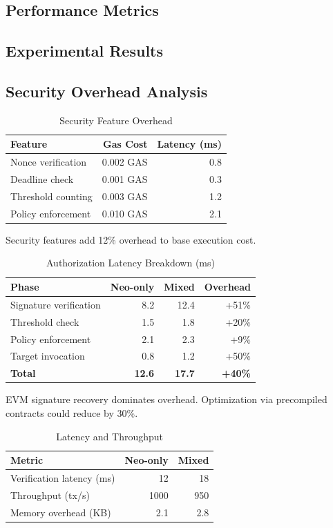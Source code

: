 \documentclass[10pt,twocolumn]{article}
\begin{document}
\subsection{Performance Metrics}

\subsection{Experimental Results}

\subsection{Security Overhead Analysis}

\begin{table}[h]
\centering
\caption{Security Feature Overhead}
\begin{tabular}{@{}lrr@{}}
\toprule
Feature & Gas Cost & Latency (ms) \\\midrule
Nonce verification & 0.002 GAS & 0.8 \\
Deadline check & 0.001 GAS & 0.3 \\
Threshold counting & 0.003 GAS & 1.2 \\
Policy enforcement & 0.010 GAS & 2.1 \\
\bottomrule
\end{tabular}
\end{table}

Security features add 12\% overhead to base execution cost.


\begin{table}[h]
\centering
\caption{Authorization Latency Breakdown (ms)}
\begin{tabular}{@{}lrrr@{}}
\toprule
Phase & Neo-only & Mixed & Overhead \\\midrule
Signature verification & 8.2 & 12.4 & +51\% \\
Threshold check & 1.5 & 1.8 & +20\% \\
Policy enforcement & 2.1 & 2.3 & +9\% \\
Target invocation & 0.8 & 1.2 & +50\% \\
\textbf{Total} & \textbf{12.6} & \textbf{17.7} & \textbf{+40\%} \\
\bottomrule
\end{tabular}
\end{table}

EVM signature recovery dominates overhead. Optimization via precompiled contracts could reduce by 30\%.


\begin{table}[h]
\centering
\caption{Latency and Throughput}
\begin{tabular}{@{}lrr@{}}
\toprule
Metric & Neo-only & Mixed \\\midrule
Verification latency (ms) & 12 & 18 \\
Throughput (tx/s) & 1000 & 950 \\
Memory overhead (KB) & 2.1 & 2.8 \\
\bottomrule
\end{tabular}
\end{table}
\end{document}
